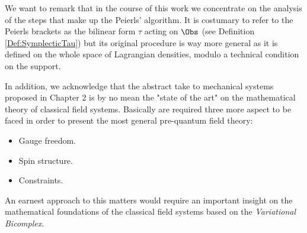 \documentclass[Main]{subfiles}
\begin{document}
		\vspace{2mm}
		
		We want to remark that in the course of this work we concentrate on the analysis of the steps that make up the Peierls' algorithm.
		It is costumary to refer to the Peierls brackets as the bilinear form $\tau$ acting on $\Obs$ (see Definition \ref{Def:SymplecticTau}) but its original procedure is way more general as it is defined on the whole space of Lagrangian densities, modulo a technical condition on the support.
		
		In addition, we acknowledge that the abstract take to mechanical systems proposed in Chapter 2 is by no mean the "state of the art"  on the mathematical theory of classical field systems.
		Basically are required three more aspect to be faced in order to present the most general pre-quantum field theory:
		\begin{itemize}
			\item Gauge freedom.
			\item Spin structure.
			\item Constraints.
		\end{itemize}
		An earnest approach to this matters would require an important insight on the mathematical foundations of the classical field systems based on the \emph{Variational Bicomplex}.\cite{G.Sardanashvily2013,Giachetta2009,Khavkine2014a}
\end{document}

